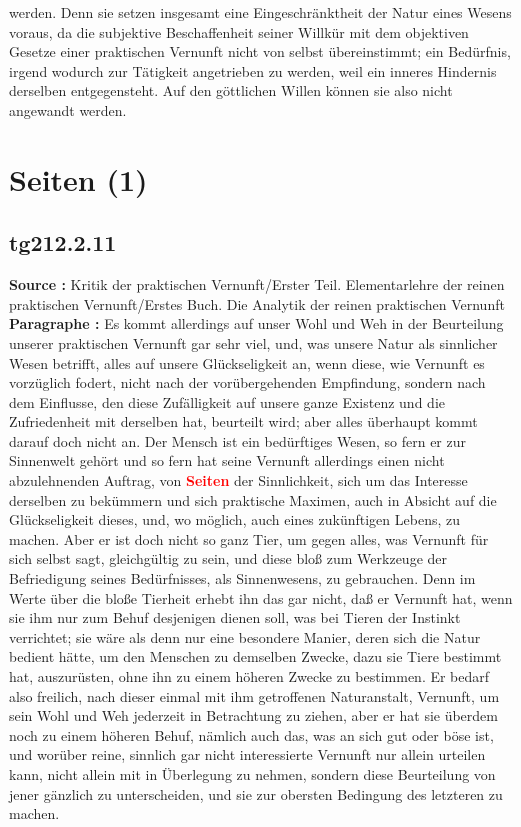 \documentclass[a4paper,12pt,twoside]{book}
\newcommand{\match}[1]{\textcolor{red}{\textbf{#1}}}
\newcommand{\unnumberedsection}[1]{
	\section*{#1}
	\addcontentsline{toc}{section}{#1}
	\markright{#1}
}
\begin{document}
werden. Denn sie setzen insgesamt eine Eingeschränktheit der Natur eines Wesens voraus, da die subjektive Beschaffenheit seiner Willkür mit dem objektiven Gesetze einer praktischen Vernunft nicht von selbst übereinstimmt; ein Bedürfnis, irgend wodurch zur Tätigkeit angetrieben zu werden, weil ein inneres Hindernis derselben entgegensteht. Auf den göttlichen Willen können sie also nicht angewandt werden. 
	
	\unnumberedsection{Seiten (1)} 
	\subsection*{tg212.2.11} 
	\textbf{Source : }Kritik der praktischen Vernunft/Erster Teil. Elementarlehre der reinen praktischen Vernunft/Erstes Buch. Die Analytik der reinen praktischen Vernunft\\  
	
	\textbf{Paragraphe : }Es kommt allerdings auf unser Wohl und Weh in der Beurteilung unserer praktischen Vernunft gar sehr viel, und, was unsere Natur als sinnlicher Wesen betrifft, alles auf unsere Glückseligkeit an, wenn diese, wie Vernunft es  vorzüglich fodert, nicht nach der vorübergehenden Empfindung, sondern nach dem Einflusse, den diese Zufälligkeit auf unsere ganze Existenz und die Zufriedenheit mit derselben hat, beurteilt wird; aber alles überhaupt kommt darauf doch nicht an. Der Mensch ist ein bedürftiges Wesen, so fern er zur Sinnenwelt gehört und so fern hat seine Vernunft allerdings einen nicht abzulehnenden Auftrag, von \match{Seiten} der Sinnlichkeit, sich um das Interesse derselben zu bekümmern und sich praktische Maximen, auch in Absicht auf die Glückseligkeit dieses, und, wo möglich, auch eines zukünftigen Lebens, zu machen. Aber er ist doch nicht so ganz Tier, um gegen alles, was Vernunft für sich selbst sagt, gleichgültig zu sein, und diese bloß zum Werkzeuge der Befriedigung seines Bedürfnisses, als Sinnenwesens, zu gebrauchen. Denn im Werte über die bloße Tierheit erhebt ihn das gar nicht, daß er Vernunft hat, wenn sie ihm nur zum Behuf desjenigen dienen soll, was bei Tieren der Instinkt verrichtet; sie wäre als denn nur eine besondere Manier, deren sich die Natur bedient hätte, um den Menschen zu demselben Zwecke, dazu sie Tiere bestimmt hat, auszurüsten, ohne ihn zu einem höheren Zwecke zu bestimmen. Er bedarf also freilich, nach dieser einmal mit ihm getroffenen Naturanstalt, Vernunft, um sein Wohl und Weh jederzeit in Betrachtung zu ziehen, aber er hat sie überdem noch zu einem höheren Behuf, nämlich auch das, was an sich gut oder böse ist, und worüber reine, sinnlich gar nicht interessierte Vernunft nur allein urteilen kann, nicht allein mit in Überlegung zu nehmen, sondern diese Beurteilung von jener gänzlich zu unterscheiden, und sie zur obersten Bedingung des letzteren zu machen. 
	
\end{document}
